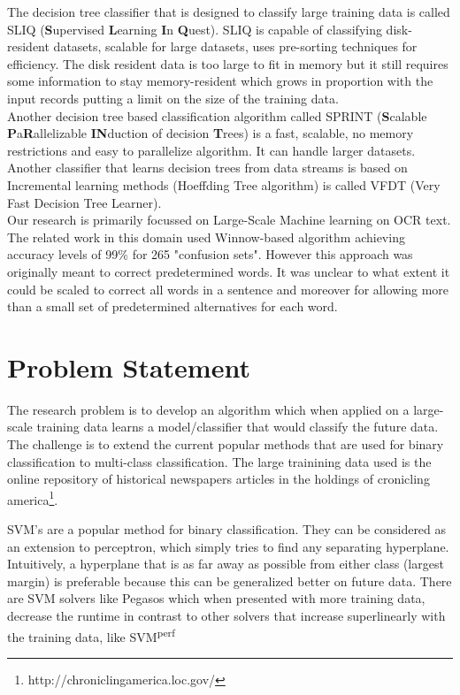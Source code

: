 \documentclass{article}
\begin{document}
The decision tree classifier that is designed to classify large training data is called SLIQ (\textbf{S}upervised \textbf{L}earning \textbf{I}n \textbf{Q}uest). SLIQ is capable of classifying disk-resident datasets, scalable for large datasets, uses pre-sorting techniques for efficiency. The disk resident data is too large to fit in memory but it still requires some information to stay memory-resident which grows in proportion with the input records putting a limit on the size of the training data.\\ Another decision tree based classification algorithm called SPRINT (\textbf{S}calable \textbf{P}a\textbf{R}allelizable \textbf{IN}duction of decision \textbf{T}rees) is a fast, scalable, no memory restrictions and easy to parallelize algorithm. It can handle larger datasets.
Another classifier that learns decision trees from data streams is based on Incremental learning methods (Hoeffding Tree algorithm) is called VFDT (Very Fast Decision Tree Learner).\\
Our research is primarily focussed on Large-Scale Machine learning on OCR text.\\
The related work in this domain used Winnow-based algorithm achieving accuracy levels of 99\% for 265 "confusion sets". However this approach was originally meant to correct predetermined words. It was unclear to what extent it could be scaled to correct all words in a sentence and moreover for allowing more than a small set of predetermined alternatives for each word.

\section{Problem Statement}
The research problem is to develop an algorithm which when applied on a large-scale training data learns a model/classifier that would classify the future data. The challenge is to extend the current popular methods that are used for binary classification to multi-class classification.
The large trainining data used is the online repository of historical newspapers articles in the holdings of cronicling america\footnote{http://chroniclingamerica.loc.gov/}.

SVM's are a popular method for binary classification. They can be considered as an extension to perceptron, which simply tries to find any separating hyperplane. Intuitively, a hyperplane that is as far away as possible from either class (largest margin) is preferable because this can be generalized better on future data.
There are SVM solvers like Pegasos which when presented with more training data, decrease the runtime in contrast to other solvers that increase superlinearly with the training data, like SVM\textsuperscript{perf}
\end{document}
